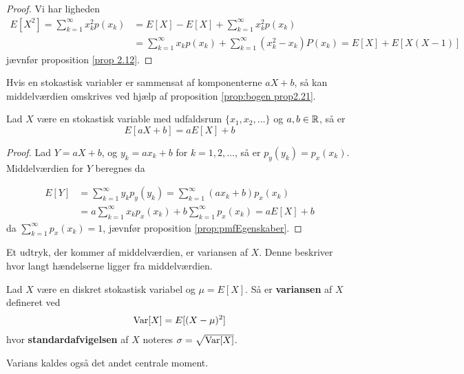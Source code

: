 \begin{proof}
Vi har ligheden
\begin{align*}
    E[X^2] = \sum^\infty_{k = 1} x_k^2 p(x_k) &= E[X] - E[X] + \sum^\infty_{k = 1} x_k^2 p(x_k) \\
    &= \sum^\infty_{k = 1} x_k p(x_k) + \sum^\infty_{k = 1} (x_k^2 - x_k)P(x_k) = E[X] + E[X(X - 1)]
\end{align*}
jævnfør proposition \ref{prop 2.12}.
\end{proof}
Hvis en stokastisk variabler er sammensat af komponenterne $aX+b$, så kan middelværdien omskrives ved hjælp af proposition \ref{prop:bogen prop2.21}.
\begin{prop} \label{prop:bogen prop2.21}
Lad $X$ være en stokastisk variable med udfaldsrum $\{x_1, x_2, \ldots\}$ og $a, b \in \mathbb{R}$, så er
\begin{equation*}
    E[aX+b] = aE[X] + b
\end{equation*}
\end{prop}
\begin{proof}
    Lad $Y = aX + b$, og $y_k = ax_k + b$ for $k = 1, 2, \ldots$, så er $p_y(y_k) = p_x(x_k)$. Middelværdien for $Y$ beregnes da
    
    \begin{align*}
        E[Y] &= \sum^\infty_{k = 1} y_k p_y(y_k) = \sum^\infty_{k = 1} (a x_k + b) p_x(x_k) \\
        &= a \sum^\infty_{k = 1}  x_k p_x(x_k) + b \sum^\infty_{k = 1} p_x(x_k) = a E[X] + b
    \end{align*}
    da $\sum^\infty_{k = 1} p_x(x_k) = 1$, jævnfør proposition \ref{prop:pmfEgenskaber}.
\end{proof}
Et udtryk, der kommer af middelværdien, er variansen af $X$. Denne beskriver hvor langt hændelserne ligger fra middelværdien. 
\begin{defn} \label{def:Varians}%
Lad $X$ være en diskret stokastisk variabel og $\mu = E[X]$. Så er \textbf{variansen} af $X$ defineret ved
\begin{align*}
    \textnormal{Var}[ X ] = E[(X-\mu)^2]
\end{align*}
hvor \textbf{standardafvigelsen} af $X$ noteres $\sigma = \sqrt{\textnormal{Var}[ X ]}$.
\end{defn}

Varians kaldes også det andet centrale moment.

